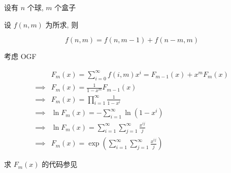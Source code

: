 设有 \(n\) 个球, \(m\) 个盒子

设 \(f(n,m)\) 为所求, 则

\[
    f(n,m)=f(n,m-1)+f(n-m,m)
\]

考虑 OGF

\[
    \begin{aligned}
                 & F_m(x) =\sum_{i=0}^{\infty}f(i,m)x^i =F_{m-1}(x)+x^m F_m(x)                     \\
        \implies & F_m(x)=\frac{1}{1-x^m}F_{m-1}(x)                                                \\
        \implies & F_m(x)=\prod_{i=1}^{\infty}\frac{1}{1-x^i}                                      \\
        \implies & \ln F_m(x)=-\sum_{i=1}^{\infty}\ln(1-x^i)                                       \\
        \implies & \ln F_m(x)=\sum_{i=1}^{\infty}\sum_{j=1}^{\infty} \frac{x^{ij}}{j}              \\
        \implies & F_m(x)=\exp\left(\sum_{i=1}^{\infty}\sum_{j=1}^{\infty} \frac{x^{ij}}{j}\right)
    \end{aligned}
\]

求 \(F_m(x)\) 的代码参见 
